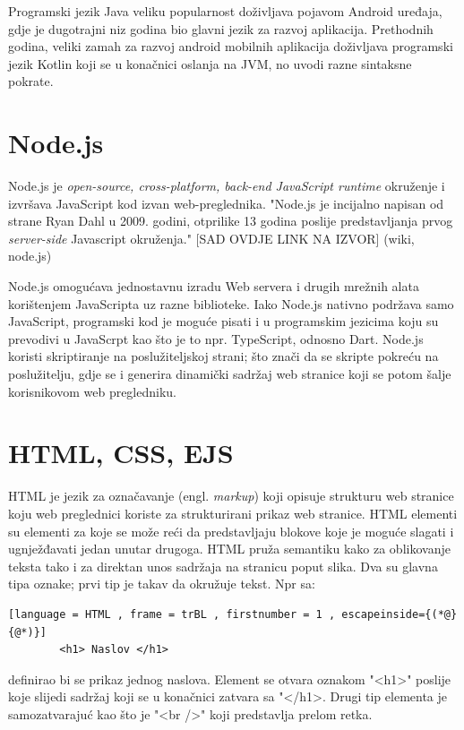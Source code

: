 \documentclass[times, utf8, zavrsni]{fer}
\begin{document}
	Programski jezik Java veliku popularnost doživljava pojavom Android uređaja, gdje je dugotrajni niz godina bio glavni jezik za razvoj aplikacija. Prethodnih godina, veliki zamah za razvoj android mobilnih aplikacija doživljava programski jezik 
	Kotlin koji se u konačnici oslanja na JVM, no uvodi razne sintaksne pokrate. 
	
	
	
	\section{Node.js}
	Node.js je \textit{open-source, cross-platform, back-end JavaScript runtime} okruženje i izvršava JavaScript kod izvan web-preglednika. "Node.js je incijalno napisan od strane  Ryan Dahl u 2009. godini, otprilike 13 godina poslije predstavljanja
	prvog  \textit{server-side} Javascript okruženja." [SAD OVDJE LINK NA IZVOR] (wiki, node.js)
	
	Node.js omogućava jednostavnu izradu Web servera i drugih mrežnih alata korištenjem JavaScripta uz razne biblioteke. Iako Node.js nativno podržava samo JavaScript, programski kod je moguće pisati i u programskim jezicima koju su prevodivi u JavaScrpt kao 
	što je to npr. TypeScript, odnosno Dart. Node.js koristi skriptiranje na poslužiteljskoj strani; što znači da se skripte pokreću na poslužitelju, gdje se i generira dinamički sadržaj web stranice koji se potom šalje korisnikovom web pregledniku. 
	
	\section{HTML, CSS, EJS}
	HTML je jezik za označavanje (engl. \textit{markup}) koji opisuje strukturu web stranice koju web preglednici koriste za strukturirani prikaz web stranice. HTML elementi su elementi za koje se može reći da predstavljaju blokove koje je moguće slagati
	i ugnježđavati jedan unutar drugoga. HTML pruža semantiku kako za oblikovanje teksta tako i za direktan unos sadržaja na stranicu poput slika.
	Dva su glavna tipa oznake; prvi tip je takav da okružuje tekst. Npr sa: 
		\begin{lstlisting}[language = HTML , frame = trBL , firstnumber = 1 , escapeinside={(*@}{@*)}]
		<h1> Naslov </h1>
		\end{lstlisting}
		definirao bi se prikaz jednog naslova. Element se otvara oznakom "<h1>" poslije koje slijedi sadržaj koji se u konačnici zatvara sa "</h1>. Drugi tip elementa je samozatvarajuć kao što je "<br />" koji predstavlja prelom retka.
\end{document}
